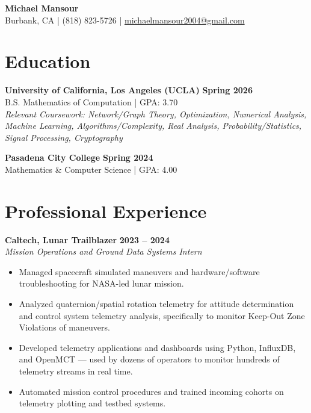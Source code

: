 \documentclass[10pt, letterpaper]{article}
\begin{document}
\begin{center}
    {\huge \textbf{Michael Mansour}} \\
    \vspace{2pt}
    Burbank, CA | (818) 823-5726 | \href{mailto:michaelmansour2004@gmail.com}{michaelmansour2004@gmail.com} \\
    \vspace{2pt}
\end{center}

\section{Education}
\textbf{University of California, Los Angeles (UCLA)} \hfill \textbf{Spring 2026} \\
B.S. Mathematics of Computation | GPA: 3.70 \\
\textit{Relevant Coursework: Network/Graph Theory, Optimization, 
Numerical Analysis, Machine Learning, Algorithms/Complexity, Real Analysis, Probability/Statistics, Signal Processing, Cryptography}

\vspace{2pt}

\noindent \textbf{Pasadena City College} \hfill \textbf{Spring 2024} \\
Mathematics \& Computer Science | GPA: 4.00

\section{Professional Experience}

\noindent \textbf{Caltech, Lunar Trailblazer} \hfill \textbf{2023 – 2024} \\
\textit{Mission Operations and Ground Data Systems Intern}
\begin{itemize}
    \item Managed spacecraft simulated maneuvers and hardware/software troubleshooting for NASA-led lunar mission.
    \item Analyzed quaternion/spatial rotation telemetry for attitude determination and control system telemetry analysis, specifically to monitor Keep-Out Zone Violations of maneuvers.
    \item Developed telemetry applications and dashboards using Python, InfluxDB, and OpenMCT — used by dozens of operators to monitor hundreds of telemetry streams in real time.
    \item Automated mission control procedures and trained incoming cohorts on telemetry plotting and testbed systems.
\end{itemize}
\end{document}
